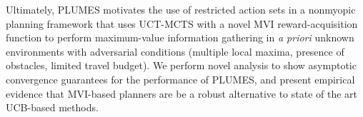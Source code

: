 \documentclass{styles/svproc}
\begin{document}

Ultimately, PLUMES motivates the use of restricted action sets in a nonmyopic planning framework that uses UCT-MCTS with a novel MVI reward-acquisition function to perform maximum-value information gathering in \textit{a priori} unknown environments with adversarial conditions (multiple local maxima, presence of obstacles, limited travel budget). We perform novel analysis to show asymptotic convergence guarantees for the performance of PLUMES, and present empirical evidence that MVI-based planners are be a robust alternative to state of the art UCB-based methods.
%
%


\end{document}

